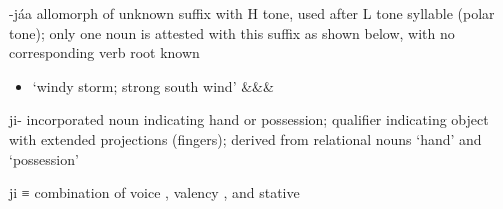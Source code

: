 \begin{morphdesc}[resume*=alphalist]
\item[-jáa]\label{m:-jáa}
	allomorph of unknown suffix  with H tone,
		used after L tone syllable (polar tone);
	only one noun is attested with this suffix as shown below,
		with no corresponding verb root known
	\begin{itemize}
	\item	{} ‘windy storm; strong south wind’
			{&\·&\·&\·}
	\end{itemize}

\item[ji-]\label{m:ji-}
	incorporated noun indicating hand or possession;
	qualifier indicating object with extended projections (fingers);
	derived from relational nouns  ‘hand’ and  ‘possession’

\item[ji]\label{m:ji}
	≡ 
	combination of voice ,
		valency ,
		and stative 
\end{morphdesc}


